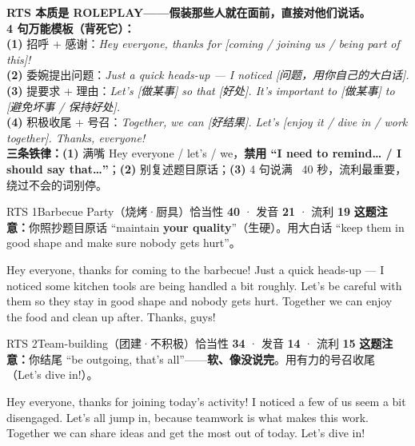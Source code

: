 \documentclass[11pt]{article}
\newcommand{\spart}[1]{\textcolor{cPartial}{\bfseries #1}}
\newcommand{\szero}[1]{\textcolor{cWrong}{\bfseries #1}}
\newcommand{\hl}[1]{\textcolor{cWrong}{\bfseries #1}}   %
\begin{document}
\begin{notebox}\small
\textbf{RTS 本质是 ROLEPLAY——假装那些人就在面前，直接对他们说话。}\\
\textbf{4 句万能模板（背死它）：}\\
\textbf{(1)} 招呼 + 感谢：\emph{Hey everyone, thanks for [coming / joining us / being part of this]!}\\
\textbf{(2)} 委婉提出问题：\emph{Just a quick heads-up --- I noticed [问题，用你自己的大白话].}\\
\textbf{(3)} 提要求 + 理由：\emph{Let's [做某事] so that [好处]. It's important to [做某事] to [避免坏事 / 保持好处].}\\
\textbf{(4)} 积极收尾 + 号召：\emph{Together, we can [好结果]. Let's [enjoy it / dive in / work together]. Thanks, everyone!}\\[2pt]
\textbf{三条铁律：}\textbf{(1)} 满嘴 Hey everyone / let's / we，\textbf{禁用 ``I need to remind… / I should say that…''}；\textbf{(2)} 别复述题目原话；\textbf{(3)} 4 句说满 ~40 秒，流利最重要，绕过不会的词别停。
\end{notebox}

\begin{qblock}{RTS 1\quad Barbecue Party（烧烤·厨具）}{恰当性 \spart{40} · 发音 \szero{21} · 流利 \szero{19}}
\textbf{这题注意：}你照抄题目原话 ``maintain \hl{your quality}''（生硬）。用大白话 ``keep them in good shape and make sure nobody gets hurt''。
\begin{modelbox}\small
Hey everyone, thanks for coming to the barbecue! Just a quick heads-up --- I noticed some kitchen tools are being handled a bit roughly. Let's be careful with them so they stay in good shape and nobody gets hurt. Together we can enjoy the food and clean up after. Thanks, guys!
\end{modelbox}
\end{qblock}

\begin{qblock}{RTS 2\quad Team-building（团建·不积极）}{恰当性 \spart{34} · 发音 \szero{14} · 流利 \szero{15}}
\textbf{这题注意：}你结尾 ``be outgoing, that's all''——\textbf{软、像没说完}。用有力的号召收尾（Let's dive in!）。
\begin{modelbox}\small
Hey everyone, thanks for joining today's activity! I noticed a few of us seem a bit disengaged. Let's all jump in, because teamwork is what makes this work. Together we can share ideas and get the most out of today. Let's dive in!
\end{modelbox}
\end{qblock}
\end{document}
